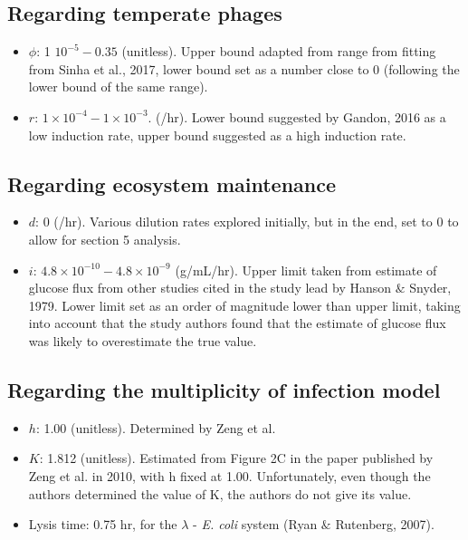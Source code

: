 \documentclass{article}
\begin{document}
\subsection{Regarding temperate phages}
\begin{itemize}
\item $\phi$: 1 \times $10^{-5} - 0.35$ (unitless). Upper bound adapted from range from fitting from Sinha et al., 2017, lower bound set as a number close to 0 (following the lower bound of the same range). 

\item $r$: $1 \times 10^{-4} - 1 \times 10^{-3}$. (/hr). Lower bound suggested by Gandon, 2016 as a low induction rate, upper bound suggested as a high induction rate. 
\end{itemize}

\subsection{Regarding ecosystem maintenance}
\begin{itemize}
\item $d$: 0 (/hr). Various dilution rates explored initially, but in the end, set to 0 to allow for section 5 analysis.

\item $i$: $4.8 \times 10^{-10} - 4.8 \times 10^{-9}$ (g/mL/hr). Upper limit taken from estimate of glucose flux from other studies cited in the study lead by Hanson $\&$ Snyder, 1979. Lower limit set as an order of magnitude lower than upper limit, taking into account that the study authors found that the estimate of glucose flux was likely to overestimate the true value.
\end{itemize}

\subsection{Regarding the multiplicity of infection model}
\begin{itemize}
\item $h$: 1.00 (unitless). Determined by Zeng et al.
\item $K$: 1.812 (unitless). Estimated from Figure 2C in the paper published by Zeng et al. in 2010, with h fixed at 1.00. Unfortunately, even though the authors determined the value of K, the authors do not give its value.
\item Lysis time: 0.75 hr, for the $\lambda$ - \textit{E. coli} system (Ryan $\&$ Rutenberg, 2007). 
\end{itemize}
\end{document}

